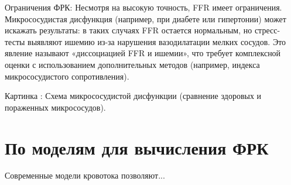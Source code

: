 Ограничения ФРК:
{Несмотря на высокую точность, FFR имеет ограничения. Микрососудистая дисфункция (например, при диабете или гипертонии) может искажать результаты: в таких случаях FFR остается нормальным, но стресс-тесты выявляют ишемию из-за нарушения вазодилатации мелких сосудов. Это явление называют «диссоциацией FFR и ишемии», что требует комплексной оценки с использованием дополнительных методов (например, индекса микрососудистого сопротивления).}

Картинка : Схема микрососудистой дисфункции (сравнение здоровых и пораженных микрососудов).

\section{По моделям для вычисления ФРК}
Современные модели кровотока позволяют...


